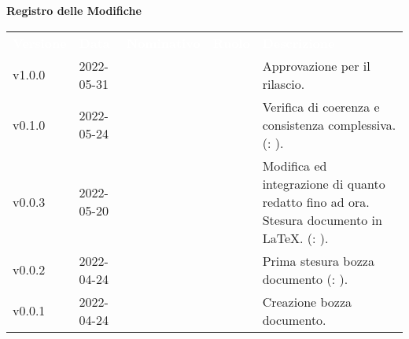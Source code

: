 
{\LARGE{\textbf{Registro delle Modifiche}}} \\
\renewcommand{\arraystretch}{1.5}
\begin{longtable}{ m{}<{\centering}  m{}<{\centering}  m{}<{\centering}  m{}<{\centering}  m{}<{\centering} }
	\rowcolor{darkblue}
	\textcolor{white}{\textbf{Versione}} &\textcolor{white}{\textbf{Data}}& \textcolor{white}{\textbf{Nominativo}} & \textcolor{white}{\textbf{Ruolo}}&\textcolor{white}{\textbf{Descrizione}}\\ 

	v1.0.0 & 2022-05-31 & \MG & \RE & Approvazione per il rilascio.	 \\
	
	v0.1.0 & 2022-05-24 & \GC & \PR & Verifica di coerenza e consistenza complessiva. (\VE: \textit{\PV}). \\

	v0.0.3 & 2022-05-20 & \GC & \PR & Modifica ed integrazione di quanto redatto fino ad ora. Stesura documento in \LaTeX{}. (\VE: \textit{\PV}). \\

	v0.0.2 & 2022-04-24 & \GC & \PR & Prima stesura bozza documento (\VE: \textit{\PV}). \\

	v0.0.1 & 2022-04-24 & \GC & \PR & Creazione bozza documento. \\

\end{longtable}

\pagebreak